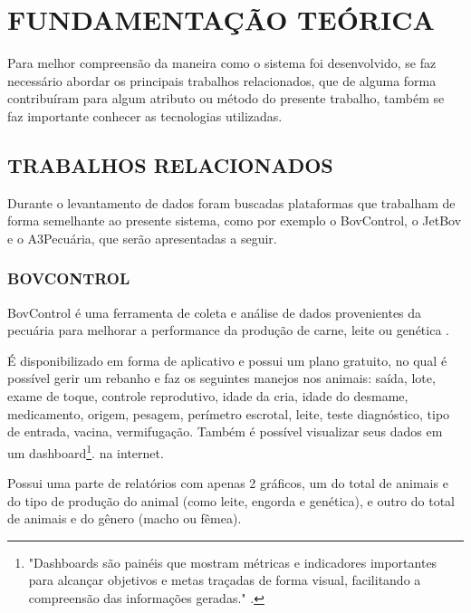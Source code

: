 %
%


\chapter{\textbf{FUNDAMENTAÇÃO TEÓRICA}}\label{chap:fundTeorica}

Para melhor compreensão da maneira como o sistema foi desenvolvido, se faz necessário abordar os principais trabalhos relacionados, que de alguma forma contribuíram para algum atributo ou método do presente trabalho, também se faz importante conhecer as tecnologias utilizadas.

\section{TRABALHOS RELACIONADOS}


Durante o levantamento de dados foram buscadas plataformas que trabalham de forma semelhante ao presente sistema, como por exemplo o BovControl, o JetBov e o A3Pecuária, que serão apresentadas a seguir.

\subsection{BOVCONTROL}

BovControl é uma ferramenta de coleta e análise de dados provenientes da pecuária para melhorar a performance da produção de carne, leite ou genética \cite{bovcontrol10}.

É disponibilizado em forma de aplicativo e possui um plano gratuito, no qual é possível gerir um rebanho e faz os seguintes manejos nos animais: saída, lote, exame de toque, controle reprodutivo, idade da cria, idade do desmame, medicamento, origem, pesagem, perímetro escrotal, leite, teste diagnóstico, tipo de entrada, vacina, vermifugação. Também é possível visualizar seus dados em um dashboard\footnote{"Dashboards são painéis que mostram métricas e indicadores importantes para alcançar objetivos e metas traçadas de forma visual, facilitando a compreensão das informações geradas." \cite{nascimento17}.}. na internet.

Possui uma parte de relatórios com apenas 2 gráficos, um do total de animais e do tipo de produção do animal (como leite, engorda e genética), e outro do total de animais e do gênero (macho ou fêmea).

